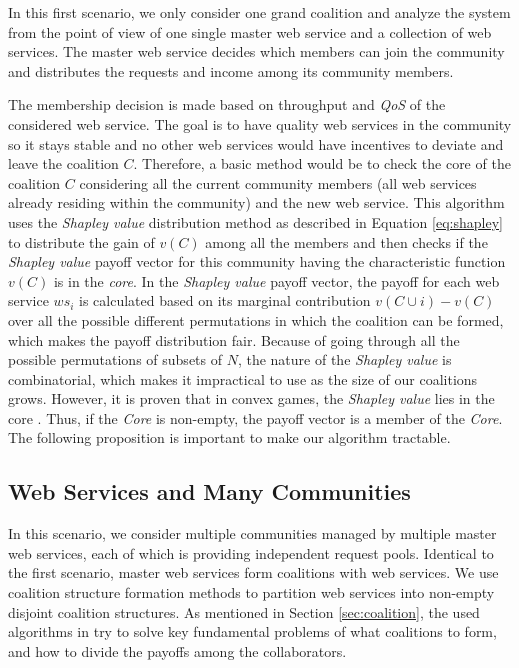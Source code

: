 In this first scenario, we only consider one grand coalition and
analyze the system from the point of view of one single master web
service and a collection of web services. The master web service
decides which members can join
the community and distributes the requests and income among its
community members.


The membership decision is made based on throughput and \emph{QoS}
of the considered web service. The goal is to have quality web
services in the community so it stays stable and no other web
services would have incentives to deviate and leave the coalition
$C$. Therefore, a basic method would be to check the core of the
coalition $C$ considering all the current community members (all
web services already residing within the community) and the new
web service. This algorithm uses the \emph{Shapley value}
distribution method as described in Equation \ref{eq:shapley} to
distribute the gain of $v(C)$ among all the members and then
checks if the \emph{Shapley value} payoff vector for this
community having the characteristic function $v(C)$ is in the
\emph{core}. In the \emph{Shapley value} payoff vector, the payoff
for each web service $ws_i$ is calculated based on its marginal
contribution $v(C \cup {i}) - v(C)$ over all the possible
different permutations in which the coalition can be formed, which
makes the payoff distribution fair. Because of going through all
the possible permutations of subsets of $N$, the nature of the
\emph{Shapley value} is combinatorial, which makes it impractical
to use as the size of our coalitions grows. However, it is proven
that in convex games, the \emph{Shapley value} lies in the core
\cite{DBLP:conf/ijcai/GrecoMPS11, myerson1991game}. Thus, if the
\emph{Core} is non-empty, the payoff vector is a member of the
\emph{Core}. The following proposition is important to make our
algorithm tractable.


\subsection {Web Services and Many Communities}

In this scenario, we consider multiple communities managed by
multiple master web services, each of which is providing
independent request pools. Identical
to the first scenario, master web services form coalitions with
web services. We use coalition structure formation methods to
partition web services into non-empty disjoint coalition
structures. As mentioned in Section \ref{sec:coalition}, the used
algorithms in \cite{Sandholm:1999:CSG:317145.317152,DBLP:conf/ijcai/GrecoMPS11,DBLP:conf/ijcai/RahwanMJ11} try to
solve key fundamental problems of what coalitions to form, and how
to divide the payoffs among the collaborators.

